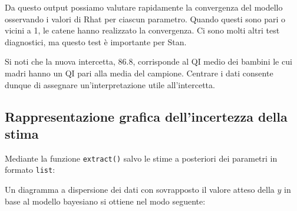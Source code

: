 \documentclass[
]{memoir}
\newenvironment{Shaded}{\begin{snugshade}}{\end{snugshade}}
\newcommand{\AttributeTok}[1]{\textcolor[rgb]{0.77,0.63,0.00}{#1}}
\newcommand{\DecValTok}[1]{\textcolor[rgb]{0.00,0.00,0.81}{#1}}
\newcommand{\FunctionTok}[1]{\textcolor[rgb]{0.00,0.00,0.00}{#1}}
\newcommand{\NormalTok}[1]{#1}
\newcommand{\OtherTok}[1]{\textcolor[rgb]{0.56,0.35,0.01}{#1}}
\newcommand{\SpecialCharTok}[1]{\textcolor[rgb]{0.00,0.00,0.00}{#1}}
\newcommand{\StringTok}[1]{\textcolor[rgb]{0.31,0.60,0.02}{#1}}
\begin{document}
\noindent
Da questo output possiamo valutare rapidamente la convergenza del modello osservando i valori di Rhat per ciascun parametro. Quando questi sono pari o vicini a 1, le catene hanno realizzato la convergenza. Ci sono molti altri test diagnostici, ma questo test è importante per Stan.

\noindent
Si noti che la nuova intercetta, 86.8, corrisponde al QI medio dei bambini le cui madri hanno un QI pari alla media del campione. Centrare i dati consente dunque di assegnare un'interpretazione utile all'intercetta.

\hypertarget{rappresentazione-grafica-dellincertezza-della-stima}{%
\subsection{Rappresentazione grafica dell'incertezza della stima}\label{rappresentazione-grafica-dellincertezza-della-stima}}

Mediante la funzione \texttt{extract()} salvo le stime a posteriori dei parametri in formato \texttt{list}:

\begin{Shaded}
\end{Shaded}

\noindent
Un diagramma a dispersione dei dati con sovrapposto il valore atteso della \(y\) in base al modello bayesiano si ottiene nel modo seguente:

\begin{Shaded}
\end{Shaded}
\end{document}
